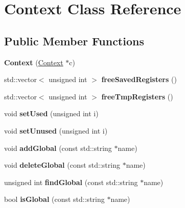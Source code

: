 \hypertarget{class_context}{}\section{Context Class Reference}
\label{class_context}
\subsection*{Public Member Functions}
\begin{DoxyCompactItemize}
\item 
\mbox{\label{class_context_a4fb0726e937fa0ddf829c408f2941ca2}} 
{\bfseries Context} (\hyperlink{class_context}{Context} $\ast$c)
\item 
\mbox{\label{class_context_ad326b2096ae2369d8188eb176d988b70}} 
std\+::vector$<$ unsigned int $>$ {\bfseries free\+Saved\+Registers} ()
\item 
\mbox{\label{class_context_a2a30d44799ac4a9339aa6927b3d56670}} 
std\+::vector$<$ unsigned int $>$ {\bfseries free\+Tmp\+Registers} ()
\item 
\mbox{\label{class_context_a13d9bba210a7318e7802d6264ca60eb8}} 
void {\bfseries set\+Used} (unsigned int i)
\item 
\mbox{\label{class_context_a1adf3153b961a2eaebf4e8b2e3cbd8bf}} 
void {\bfseries set\+Unused} (unsigned int i)
\item 
\mbox{\label{class_context_a8dbea6df459519700ec75964690475eb}} 
void {\bfseries add\+Global} (const std\+::string $\ast$name)
\item 
\mbox{\label{class_context_a2cd8e7b3ee3343f4a0df1f7e0594af0e}} 
void {\bfseries delete\+Global} (const std\+::string $\ast$name)
\item 
\mbox{\label{class_context_afee1a24074cc55823b8cf516b0c006de}} 
unsigned int {\bfseries find\+Global} (const std\+::string $\ast$name)
\item 
\mbox{\label{class_context_a4392e063038524f16ded5a4727da86ac}} 
bool {\bfseries is\+Global} (const std\+::string $\ast$name)

\end{DoxyCompactItemize}
